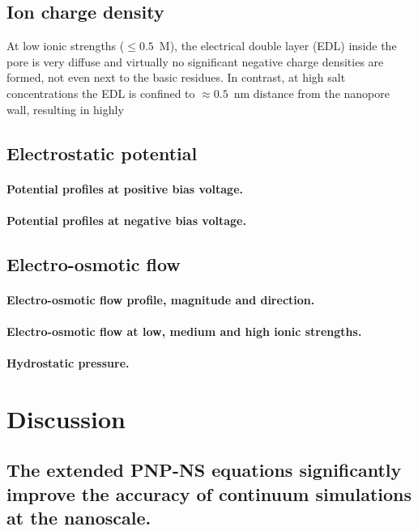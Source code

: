 \documentclass[journal=ancac3, manuscript=article, etalmode=truncate,maxauthors=0]{achemso}
\begin{document}
\subsection{Ion charge density}
At low ionic strengths ($\le0.5$~M), the electrical double layer (EDL) inside the pore is very diffuse and 
virtually no significant negative charge densities are formed, not even next to the basic residues. In 
contrast, at high salt concentrations the EDL is confined to $\approx0.5$~nm distance from the nanopore wall, 
resulting in highly 

\subsection{Electrostatic potential}

\paragraph{Potential profiles at positive bias voltage.}
\paragraph{Potential profiles at negative bias voltage.}




\subsection{Electro-osmotic flow}


\paragraph{Electro-osmotic flow profile, magnitude and direction.}
\paragraph{Electro-osmotic flow at low, medium and high ionic strengths.}
\paragraph{Hydrostatic pressure.}



\section{Discussion}\label{sect:discussion}

\subsection{The extended PNP-NS equations significantly improve the accuracy of continuum simulations at the 
nanoscale.}
\end{document}
